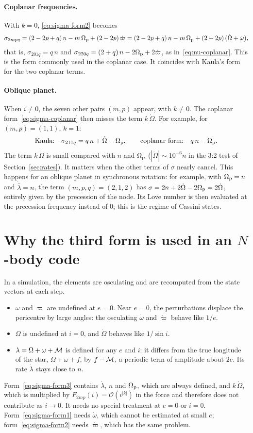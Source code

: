 \paragraph{Coplanar frequencies.} With $k=0$, \eqref{eq:sigma-form2} becomes
\begin{equation}
  \sigma_{2mpq}=(2-2p+q)\,n-m\,\Omega_{\mathrm p}+(2-2p)\,\dot\varpi=(2-2p+q)\,n-m\,\Omega_{\mathrm p}+(2-2p)\,(\dot\Omega+\dot\omega), \label{eq:sigma-coplanar}
\end{equation}
that is, $\sigma_{201q}=q\,n$ and $\sigma_{220q}=(2+q)\,n-2\Omega_{\mathrm p}+2\dot\varpi$, as in~\eqref{eq:nu-coplanar}. This is the form commonly used in the coplanar case. It coincides with Kaula's form for the two coplanar terms.

\paragraph{Oblique planet.} When $i\neq0$, the seven other pairs $(m,p)$ appear, with $k\neq0$. The coplanar form~\eqref{eq:sigma-coplanar} then misses the term $k\,\dot\Omega$. For example, for $(m,p)=(1,1)$, $k=1$:
\[
  \text{Kaula:}\quad\sigma_{211q}=q\,n+\dot\Omega-\Omega_{\mathrm p},\qquad \text{coplanar form:}\quad q\,n-\Omega_{\mathrm p} .
\]
The term $k\,\dot\Omega$ is small compared with $n$ and $\Omega_{\mathrm p}$ ($|\dot\Omega|\sim10^{-6}n$ in the 3:2 test of Section~\ref{sec:rates}). It matters when the other terms of $\sigma$ nearly cancel. This happens for an oblique planet in synchronous rotation: for example, with $\Omega_{\mathrm p}=n$ and $\dot{\bar\lambda}=n$, the term $(m,p,q)=(2,1,2)$ has $\sigma=2n+2\dot\Omega-2\Omega_{\mathrm p}=2\dot\Omega$, entirely given by the precession of the node. Its Love number is then evaluated at the precession frequency instead of $0$; this is the regime of Cassini states.

\section{Why the third form is used in an $N$-body code}
In a simulation, the elements are osculating and are recomputed from the state vectors at each step.
\begin{itemize}
  \item $\omega$ and $\varpi$ are undefined at $e=0$. Near $e=0$, the perturbations displace the pericentre by large angles: the osculating $\dot\omega$ and $\dot\varpi$ behave like $1/e$.
  \item $\Omega$ is undefined at $i=0$, and $\dot\Omega$ behaves like $1/\sin i$.
  \item $\lambda=\Omega+\omega+\mathcal{M}$ is defined for any $e$ and $i$: it differs from the true longitude of the star, $\Omega+\omega+f$, by $f-\mathcal{M}$, a periodic term of amplitude about $2e$. Its rate $\dot\lambda$ stays close to $n$.
\end{itemize}
Form~\eqref{eq:sigma-form3} contains $\dot\lambda$, $n$ and $\Omega_{\mathrm p}$, which are always defined, and $k\,\dot\Omega$, which is multiplied by $F_{2mp}(i)=\mathcal O(i^{|k|})$ in the force and therefore does not contribute as $i\to0$. It needs no special treatment at $e=0$ or $i=0$. Form~\eqref{eq:sigma-form1} needs $\dot\omega$, which cannot be estimated at small $e$; form~\eqref{eq:sigma-form2} needs $\dot\varpi$, which has the same problem.

